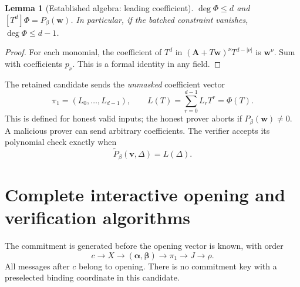 \documentclass[11pt]{article}
\theoremstyle{plain}
\newtheorem{lemma}[theorem]{Lemma}
\theoremstyle{definition}
\theoremstyle{remark}
\begin{document}
\begin{lemma}[Established algebra: leading coefficient]\label{lem:leading}
$\deg\Phi\leq d$ and $[T^d]\Phi=P_\beta(\mathbf w)$.
In particular, if the batched constraint vanishes, $\deg\Phi\leq d-1$.
\end{lemma}
\begin{proof}
For each monomial, the coefficient of $T^d$ in
$(\mathbf A+T\mathbf w)^\nu T^{d-|\nu|}$ is $\mathbf w^\nu$.
Sum with coefficients $p_\nu$. This is a formal identity in any field.
\end{proof}
The retained candidate sends the \emph{unmasked} coefficient vector
\begin{equation}\label{eq:response}
 \pi_1=(L_0,\ldots,L_{d-1}),\qquad
 L(T)=\sum_{r=0}^{d-1}L_rT^r=\Phi(T).
\end{equation}
This is defined for honest valid inputs; the honest prover aborts if
$P_\beta(\mathbf w)\ne0$. A malicious prover can send arbitrary coefficients.
The verifier accepts its polynomial check exactly when
\begin{equation}\label{eq:verify}
 \widetilde P_\beta(\mathbf v,\Delta)=L(\Delta).
\end{equation}

\section{Complete interactive opening and verification algorithms}
The commitment is generated before the opening vector is known, with order
\begin{equation}\label{eq:order}
 c\longrightarrow X\longrightarrow(\boldsymbol\alpha,\boldsymbol\beta)
 \longrightarrow\pi_1\longrightarrow J\longrightarrow\rho.
\end{equation}
All messages after $c$ belong to opening. There is no commitment key with a
preselected binding coordinate in this candidate.
\end{document}
